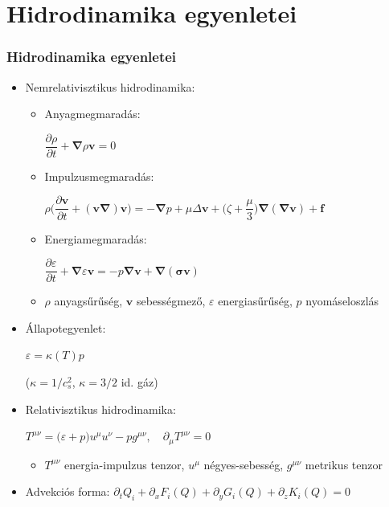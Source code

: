 \documentclass{beamer}
\begin{document}
\section{Hidrodinamika egyenletei}
\begin{frame}
\frametitle{Hidrodinamika egyenletei}
\begin{itemize}
\item<1-> Nemrelativisztikus hidrodinamika:
\begin{itemize}
\item<2-> Anyagmegmaradás:\quad \begin{large}$\dfrac{\partial \rho}{\partial t} + \bm{\nabla}\rho\bm{v}=0$\end{large}
\item<3-> Impulzusmegmaradás:\quad \begin{center}\begin{large}$\rho\Big(\dfrac{\partial \bm{v}}{\partial t}+(\bm{v\nabla})\bm{v}\Big)=-\bm{\nabla}p +\mu\Delta\bm{v}+\Big(\zeta+\dfrac{\mu}{3}\Big)\bm{\nabla}(\bm{\nabla v})+\bm{f}$\end{large}\end{center}
\item<4-> Energiamegmaradás: \quad\begin{large}$\dfrac{\partial \varepsilon}{\partial t}+\bm{\nabla}\varepsilon\bm{v}=-p\bm{\nabla v}+\bm{\nabla(\sigma v)}$\end{large}
\item<4-> $\rho$ anyagsűrűség, $\bm{v}$ sebességmező, $\varepsilon$ energiasűrűség, $p$ nyomáseloszlás
\end{itemize}


\item<5-> Állapotegyenlet:\quad \begin{large}$\varepsilon=\kappa(T)p\quad$\end{large} ($\kappa=1/c_s^2$, $\kappa=3/2$ id. gáz)

\item<6-> Relativisztikus hidrodinamika:
\begin{Large}
\begin{center}$T^{\mu\nu}=\big(\varepsilon+p\big)u^\mu u^\nu-pg^{\mu\nu},\quad \partial_\mu T^{\mu\nu}=0$\end{center}
\end{Large}
\begin{itemize}
\item<6-> $T^{\mu\nu}$ energia-impulzus tenzor, $u^\mu$ négyes-sebesség, $g^{\mu\nu}$ metrikus tenzor
\end{itemize}
\item<7-> Advekciós forma: $\partial_t Q_i+\partial_x F_i(Q)+\partial_y G_i(Q)+\partial_z K_i(Q)=0$

\end{itemize}
\end{frame}
\end{document}
